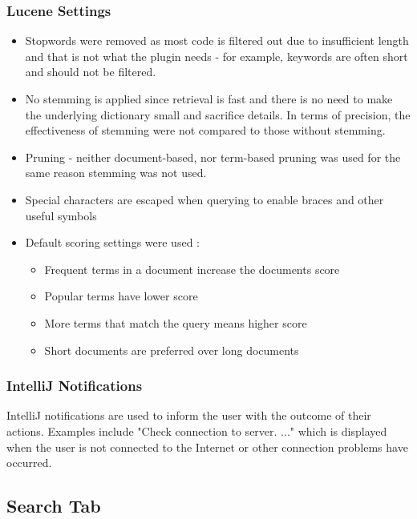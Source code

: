 \documentclass{l4proj}
\begin{document}
\subsubsection{Lucene Settings}
\begin{itemize}

\item Stopwords were removed as most code is filtered out due to insufficient length and that is not what the plugin needs - for example, keywords are often short and should not be filtered.

\item No stemming is applied since retrieval is fast and there is no need to make the underlying dictionary small and sacrifice details. In terms of precision, the effectiveness of stemming were not compared to those without stemming. 

\item Pruning - neither document-based, nor term-based pruning was used for the same reason stemming was not used.

\item Special characters are escaped when querying to enable braces and other useful symbols 

\item Default scoring settings were used \cite{lucene-scoring}:

\begin{itemize}
\item Frequent terms in a document increase the documents score
\item Popular terms have lower score
\item More terms that match the query means higher score
\item Short documents are preferred over long documents 
\end{itemize}

\end{itemize}

\subsubsection{IntelliJ Notifications} 
IntelliJ notifications are used to inform the user with the outcome of their actions. Examples include "Check connection to server. ..." which is displayed when the user is not connected to the Internet or other connection problems have occurred.


\subsection{Search Tab}
\end{document}
